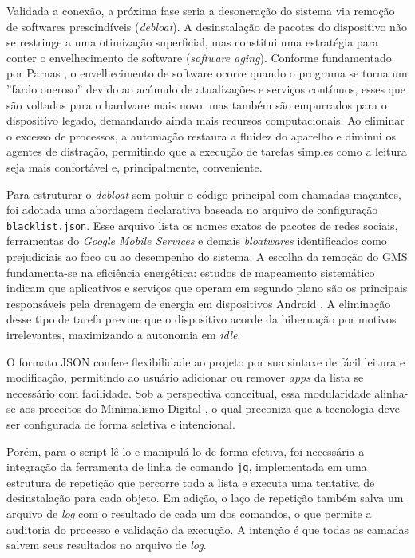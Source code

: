 \documentclass[
    12pt,
    openright,
    oneside,
    a4paper,
    english,
    brazilian
    ]{abntex2}
\begin{document}
Validada a conexão, a próxima fase seria a desoneração do sistema via remoção de softwares prescindíveis (\textit{debloat}). A desinstalação de pacotes do dispositivo não se restringe a uma otimização superficial, mas constitui uma estratégia para conter o envelhecimento de software (\textit{software aging}). Conforme fundamentado por Parnas \cite{parnas1994}, o envelhecimento de software ocorre quando o programa se torna um ''fardo oneroso'' devido ao acúmulo de atualizações e serviços contínuos, esses que são voltados para o hardware mais novo, mas também são empurrados para o dispositivo legado, demandando ainda mais recursos computacionais. Ao eliminar o excesso de processos, a automação restaura a fluidez do aparelho e diminui os agentes de distração, permitindo que a execução de tarefas simples como a leitura seja mais confortável e, principalmente, conveniente. 

Para estruturar o \textit{debloat} sem poluir o código principal com chamadas maçantes, foi adotada uma abordagem declarativa baseada no arquivo de configuração \texttt{blacklist.json}. Esse arquivo lista os nomes exatos de pacotes de redes sociais, ferramentas do \textit{Google Mobile Services} e demais \textit{bloatwares} identificados como prejudiciais ao foco ou ao desempenho do sistema. A escolha da remoção do GMS fundamenta-se na eficiência energética: estudos de mapeamento sistemático indicam que aplicativos e serviços que operam em segundo plano são os principais responsáveis pela drenagem de energia em dispositivos Android \cite{monteiro2023}. A eliminação desse tipo de tarefa previne que o dispositivo acorde da hibernação por motivos irrelevantes, maximizando a autonomia em \textit{idle}.

O formato JSON confere flexibilidade ao projeto por sua sintaxe de fácil leitura e modificação, permitindo ao usuário adicionar ou remover \textit{apps} da lista se necessário com facilidade. Sob a perspectiva conceitual, essa modularidade alinha-se aos preceitos do Minimalismo Digital \cite{newport2019}, o qual preconiza que a tecnologia deve ser configurada de forma seletiva e intencional.

Porém, para o script lê-lo e manipulá-lo de forma efetiva, foi necessária a integração da ferramenta de linha de comando \texttt{jq}, implementada em uma estrutura de repetição que percorre toda a lista e executa uma tentativa de desinstalação para cada objeto. Em adição, o laço de repetição também salva um arquivo de \textit{log} com o resultado de cada um dos comandos, o que permite a auditoria do processo e validação da execução. A intenção é que todas as camadas salvem seus resultados no arquivo de \textit{log}. 
\end{document}
